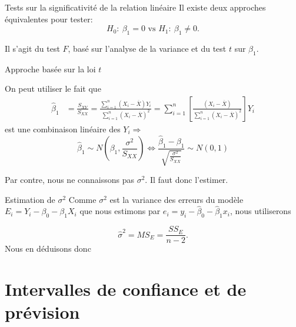 \documentclass{BeamerTemplate}
\begin{document}
\begin{frame}[t]{Tests sur la significativité de la relation linéaire}
Il existe deux approches équivalentes pour tester:
$$
H_0:~\beta_1=0\text{\ \ \ \ vs\ \ \ \ }H_1:~\beta_1\neq0.
$$


\vspace{0.5cm}

Il s'agit du test $F$, basé sur l'analyse de la variance et du test $t$ sur $\beta_1$.

\end{frame}



\begin{frame}[t]{Approche basée sur la loi $t$}

{\small
On peut utiliser le fait que
\begin{align*}
\hat{\beta}_1&=\frac{S_{XY}}{S_{XX}}=\frac{\sum_{i=1}^n(X_i-\overline{X})Y_i}{\sum_{i=1}^n(X_i-\overline{X})^2}
=\sum_{i=1}^n\left[\frac{(X_i-\overline{X})}{\sum_{i=1}^n(X_i-\overline{X})^2}\right]Y_i
\end{align*}
est une combinaison linéaire des $Y_i\Rightarrow$
$$
\hat{\beta}_1\sim N\left(\beta_1,\frac{\sigma^2}{S_{XX}}\right)\Leftrightarrow
\frac{\hat{\beta}_1-\beta_1}{\sqrt{\frac{\sigma^2}{S_{XX}}}}\sim N(0,1)
$$

Par contre, nous ne connaissons pas $\sigma^2$. Il faut donc l'estimer. 



}
\end{frame}

\begin{frame}{Estimation de $\sigma^2$}
Comme $\sigma^2$ est la variance des erreurs du modèle $E_i=Y_i-\beta_0-\beta_1 X_i$ que nous estimons par $e_i=y_i-\hat{\beta}_0-\hat{\beta}_1 x_i$, nous utiliserons

$$\hat{\sigma}^2=MS_E= \frac{SS_E}{n-2}.$$
Nous en déduisons donc
\end{frame}
\section{Intervalles de confiance et de prévision}
\end{document}
